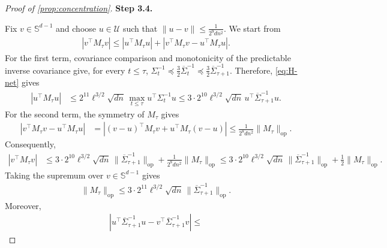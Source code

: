 \documentclass[11pt]{article}
\newcommand{\proofstepinline}[1]{%
    {\sffamily\bfseries\color{blue!55!black}Step #1.}\enspace
}
\newcommand{\op}{\mathrm{op}}
\newcommand{\1}{\mathbf 1}
\begin{document}
\begin{proof}[Proof of \cref{prop:concentration}]
    \proofstepinline{3.4}
    Fix $v\in\mathbb S^{d-1}$ and choose $u\in\mathcal U$ such that $\|u-v\| \leq \frac{1}{2^9dn^2}$.
    We start from
    \begin{align}
        |v^\top M_\tau v|
        \leq
        |u^\top M_\tau u|
        +
        |v^\top M_\tau v-u^\top M_\tau u|.
    \end{align}
    For the first term, covariance comparison and monotonicity of the
    predictable inverse covariance give, for every $t\leq\tau$,
    $\Sigma_t^{-1}
        \preceq
        \frac32\overline\Sigma_t^{-1}
        \preceq
        \frac32\overline\Sigma_{\tau+1}^{-1}$.
    Therefore, \eqref{eq:H-net} gives
    \begin{align}
        |u^\top M_\tau u|
         & \leq
        2^{11}\ell^{3/2}\sqrt{dn}\,
        \max_{t\leq\tau}u^\top\Sigma_t^{-1}u
        \leq
        3\cdot2^{10}\ell^{3/2}\sqrt{dn}\,
        u^\top\overline\Sigma_{\tau+1}^{-1}u.
    \end{align}
    For the second term, the symmetry of $M_\tau$ gives
    \begin{align}
        |v^\top M_\tau v-u^\top M_\tau u|
         & =
        \left|
        (v-u)^\top M_\tau v
        +
        u^\top M_\tau(v-u)
        \right|
        \leq
        \frac{1}{2^8dn^2}\|M_\tau\|_{\op}.
    \end{align}
    Consequently,
    \begin{align}
        |v^\top M_\tau v|
         & \leq
        3\cdot2^{10}\ell^{3/2}\sqrt{dn}\,
        \|\overline\Sigma_{\tau+1}^{-1}\|_{\op}
        +
        \frac{1}{2^8dn^2}\|M_\tau\|_{\op}
        \leq
        3\cdot2^{10}\ell^{3/2}\sqrt{dn}\,
        \|\overline\Sigma_{\tau+1}^{-1}\|_{\op}
        +
        \frac{1}{2}\|M_\tau\|_{\op}.
    \end{align}
    Taking the supremum over $v\in\mathbb S^{d-1}$ gives
    \begin{align}
        \|M_\tau\|_{\op}
        \leq
        3\cdot2^{11}\ell^{3/2}\sqrt{dn}\,
        \|\overline\Sigma_{\tau+1}^{-1}\|_{\op}.
    \end{align}
    Moreover,
    \begin{align}
        \left|
        u^\top\overline\Sigma_{\tau+1}^{-1}u
        -
        v^\top\overline\Sigma_{\tau+1}^{-1}v
        \right|
        \leq

\end{align}
\end{proof}
\end{document}
